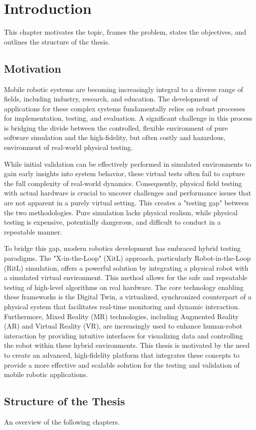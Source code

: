 \chapter{Introduction} \label{chap:introduction}

This chapter motivates the topic, frames the problem, states the objectives, and outlines the structure of the thesis.

\section{Motivation}
Mobile robotic systems are becoming increasingly integral to a diverse range of fields, including industry, research, and education. The development of applications for these complex systems fundamentally relies on robust processes for implementation, testing, and evaluation. A significant challenge in this process is bridging the divide between the controlled, flexible environment of pure software simulation and the high-fidelity, but often costly and hazardous, environment of real-world physical testing.

While initial validation can be effectively performed in simulated environments to gain early insights into system behavior, these virtual tests often fail to capture the full complexity of real-world dynamics. Consequently, physical field testing with actual hardware is crucial to uncover challenges and performance issues that are not apparent in a purely virtual setting. This creates a "testing gap" between the two methodologies. Pure simulation lacks physical realism, while physical testing is expensive, potentially dangerous, and difficult to conduct in a repeatable manner.

To bridge this gap, modern robotics development has embraced hybrid testing paradigms. The "X-in-the-Loop" (XitL) approach, particularly Robot-in-the-Loop (RitL) simulation, offers a powerful solution by integrating a physical robot with a simulated virtual environment. This method allows for the safe and repeatable testing of high-level algorithms on real hardware. The core technology enabling these frameworks is the Digital Twin, a virtualized, synchronized counterpart of a physical system that facilitates real-time monitoring and dynamic interaction. Furthermore, Mixed Reality (MR) technologies, including Augmented Reality (AR) and Virtual Reality (VR), are increasingly used to enhance human-robot interaction by providing intuitive interfaces for visualizing data and controlling the robot within these hybrid environments. This thesis is motivated by the need to create an advanced, high-fidelity platform that integrates these concepts to provide a more effective and scalable solution for the testing and validation of mobile robotic applications.

\section{Structure of the Thesis}
An overview of the following chapters.
